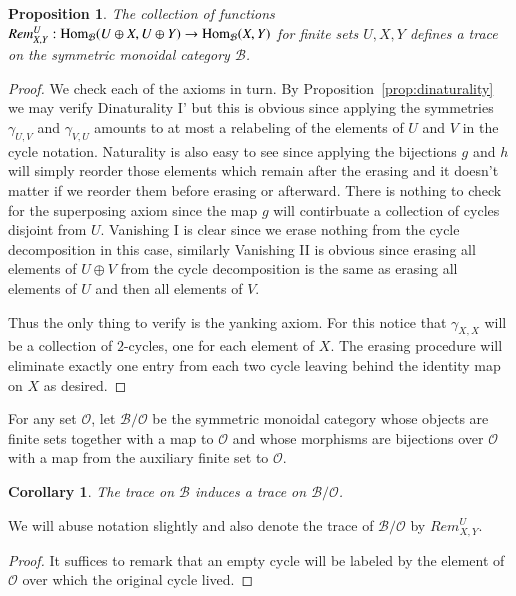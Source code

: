 \documentclass{amsart}
\def\tn{\textnormal}
\def\mc{\mathcal}
\def\Hom{\tn{Hom}}
\def\to{\rightarrow}
\def\mcB{\mc{B}}
\def\mcO{\mc{O}}
\newtheorem{proposition}[subsection]{Proposition}
\newtheorem{corollary}[subsection]{Corollary}
\theoremstyle{remark}
\theoremstyle{definition}
\begin{document}
\begin{proposition}

The collection of functions $Rem^U_{X,Y}:\Hom_\mcB(U\oplus X,U\oplus Y)\to\Hom_\mcB(X,Y)$ for finite sets $U,X,Y$ defines a trace on the symmetric monoidal category $\mcB$.

\end{proposition}

\begin{proof}

We check each of the axioms in turn.  By Proposition~\ref{prop:dinaturality} we may verify Dinaturality I' but this is obvious since applying the symmetries $\gamma_{U,V}$ and $\gamma_{V,U}$ amounts to at most a relabeling of the elements of $U$ and $V$ in the cycle notation.  Naturality is also easy to see since applying the bijections $g$ and $h$ will simply reorder those elements which remain after the erasing and it doesn't matter if we reorder them before erasing or afterward.  There is nothing to check for the superposing axiom since the map $g$ will contirbuate a collection of cycles disjoint from $U$.  Vanishing I is clear since we erase nothing from the cycle decomposition in this case, similarly Vanishing II is obvious since erasing all elements of $U\oplus V$ from the cycle decomposition is the same as erasing all elements of $U$ and then all elements of $V$.  

Thus the only thing to verify is the yanking axiom.  For this notice that $\gamma_{X,X}$ will be a collection of $2$-cycles, one for each element of $X$.  The erasing procedure will eliminate exactly one entry from each two cycle leaving behind the identity map on $X$ as desired.

\end{proof}

For any set $\mcO$, let $\mcB/\mcO$ be the symmetric monoidal category whose objects are finite sets together with a map to $\mcO$ and whose morphisms are bijections over $\mcO$ with a map from the auxiliary finite set to $\mcO$.

\begin{corollary}
The trace on $\mcB$ induces a trace on $\mcB/\mcO$.
\end{corollary}
We will abuse notation slightly and also denote the trace of $\mcB/\mcO$ by $Rem^U_{X,Y}$.
\begin{proof}

It suffices to remark that an empty cycle will be labeled by the element of $\mcO$ over which the original cycle lived.

\end{proof}
\end{document}
